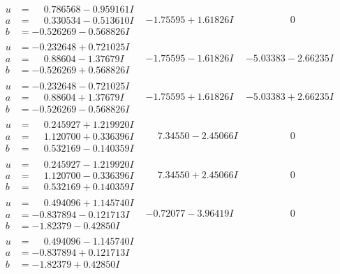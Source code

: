 \documentclass[1p]{elsarticle_modified}
\theoremstyle{definition}
\begin{document}
$$\begin{array}{c|c|c}
\begin{aligned}
u &= \phantom{-}0.786568 - 0.959161 I \\
a &= \phantom{-}0.330534 - 0.513610 I \\
b &= -0.526269 - 0.568826 I\end{aligned}
 & -1.75595 + 1.61826 I & \phantom{-0.000000 } 0 \\ \hline\begin{aligned}
u &= -0.232648 + 0.721025 I \\
a &= \phantom{-}0.88604 - 1.37679 I \\
b &= -0.526269 + 0.568826 I\end{aligned}
 & -1.75595 - 1.61826 I & -5.03383 - 2.66235 I \\ \hline\begin{aligned}
u &= -0.232648 - 0.721025 I \\
a &= \phantom{-}0.88604 + 1.37679 I \\
b &= -0.526269 - 0.568826 I\end{aligned}
 & -1.75595 + 1.61826 I & -5.03383 + 2.66235 I \\ \hline\begin{aligned}
u &= \phantom{-}0.245927 + 1.219920 I \\
a &= \phantom{-}1.120700 + 0.336396 I \\
b &= \phantom{-}0.532169 - 0.140359 I\end{aligned}
 & \phantom{-}7.34550 - 2.45066 I & \phantom{-0.000000 } 0 \\ \hline\begin{aligned}
u &= \phantom{-}0.245927 - 1.219920 I \\
a &= \phantom{-}1.120700 - 0.336396 I \\
b &= \phantom{-}0.532169 + 0.140359 I\end{aligned}
 & \phantom{-}7.34550 + 2.45066 I & \phantom{-0.000000 } 0 \\ \hline\begin{aligned}
u &= \phantom{-}0.494096 + 1.145740 I \\
a &= -0.837894 - 0.121713 I \\
b &= -1.82379 - 0.42850 I\end{aligned}
 & -0.72077 - 3.96419 I & \phantom{-0.000000 } 0 \\ \hline\begin{aligned}
u &= \phantom{-}0.494096 - 1.145740 I \\
a &= -0.837894 + 0.121713 I \\
b &= -1.82379 + 0.42850 I\end{aligned}

\end{array}$$
\end{document}
